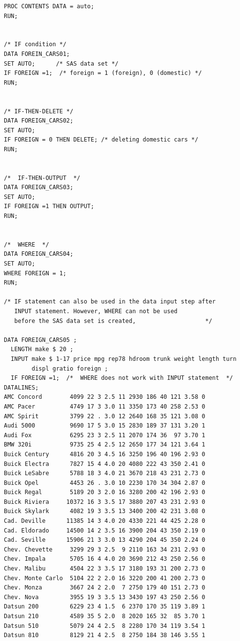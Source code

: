 \documentclass[
]{book}
\begin{document}
\begin{verbatim}
PROC CONTENTS DATA = auto;
RUN;


/* IF condition */
DATA FOREIN_CARS01;
SET AUTO;      /* SAS data set */
IF FOREIGN =1;  /* foreign = 1 (foreign), 0 (domestic) */
RUN;


/* IF-THEN-DELETE */
DATA FOREIGN_CARS02;
SET AUTO;
IF FOREIGN = 0 THEN DELETE; /* deleting domestic cars */
RUN;


/*  IF-THEN-OUTPUT  */
DATA FOREIGN_CARS03;
SET AUTO;
IF FOREIGN =1 THEN OUTPUT;
RUN;


/*  WHERE  */
DATA FOREIGN_CARS04;
SET AUTO;
WHERE FOREIGN = 1;
RUN;

/* IF statement can also be used in the data input step after 
   INPUT statement. However, WHERE can not be used
   before the SAS data set is created,                    */

DATA FOREIGN_CARS05 ;
  LENGTH make $ 20 ;
  INPUT make $ 1-17 price mpg rep78 hdroom trunk weight length turn
        displ gratio foreign ;
  IF FOREIGN =1;  /*  WHERE does not work with INPUT statement  */
DATALINES;
AMC Concord        4099 22 3 2.5 11 2930 186 40 121 3.58 0
AMC Pacer          4749 17 3 3.0 11 3350 173 40 258 2.53 0
AMC Spirit         3799 22 . 3.0 12 2640 168 35 121 3.08 0
Audi 5000          9690 17 5 3.0 15 2830 189 37 131 3.20 1
Audi Fox           6295 23 3 2.5 11 2070 174 36  97 3.70 1
BMW 320i           9735 25 4 2.5 12 2650 177 34 121 3.64 1
Buick Century      4816 20 3 4.5 16 3250 196 40 196 2.93 0
Buick Electra      7827 15 4 4.0 20 4080 222 43 350 2.41 0
Buick LeSabre      5788 18 3 4.0 21 3670 218 43 231 2.73 0
Buick Opel         4453 26 . 3.0 10 2230 170 34 304 2.87 0
Buick Regal        5189 20 3 2.0 16 3280 200 42 196 2.93 0
Buick Riviera     10372 16 3 3.5 17 3880 207 43 231 2.93 0
Buick Skylark      4082 19 3 3.5 13 3400 200 42 231 3.08 0
Cad. Deville      11385 14 3 4.0 20 4330 221 44 425 2.28 0
Cad. Eldorado     14500 14 2 3.5 16 3900 204 43 350 2.19 0
Cad. Seville      15906 21 3 3.0 13 4290 204 45 350 2.24 0
Chev. Chevette     3299 29 3 2.5  9 2110 163 34 231 2.93 0
Chev. Impala       5705 16 4 4.0 20 3690 212 43 250 2.56 0
Chev. Malibu       4504 22 3 3.5 17 3180 193 31 200 2.73 0
Chev. Monte Carlo  5104 22 2 2.0 16 3220 200 41 200 2.73 0
Chev. Monza        3667 24 2 2.0  7 2750 179 40 151 2.73 0
Chev. Nova         3955 19 3 3.5 13 3430 197 43 250 2.56 0
Datsun 200         6229 23 4 1.5  6 2370 170 35 119 3.89 1
Datsun 210         4589 35 5 2.0  8 2020 165 32  85 3.70 1
Datsun 510         5079 24 4 2.5  8 2280 170 34 119 3.54 1
Datsun 810         8129 21 4 2.5  8 2750 184 38 146 3.55 1

\end{verbatim}
\end{document}
